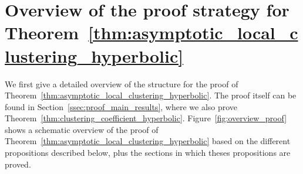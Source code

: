 \section{Overview of the proof strategy for Theorem~\ref{thm:asymptotic_local_clustering_hyperbolic}}\label{sec:proof_outline}

We first give a detailed overview of the structure for the proof of Theorem~\ref{thm:asymptotic_local_clustering_hyperbolic}. The proof itself can be found in Section~\ref{ssec:proof_main_results}, where we also prove Theorem~\ref{thm:clustering_coefficient_hyperbolic}. Figure~\ref{fig:overview_proof} shows a schematic overview of the proof of Theorem~\ref{thm:asymptotic_local_clustering_hyperbolic} based on the different propositions described below, plus the sections in which theses propositions are proved.

